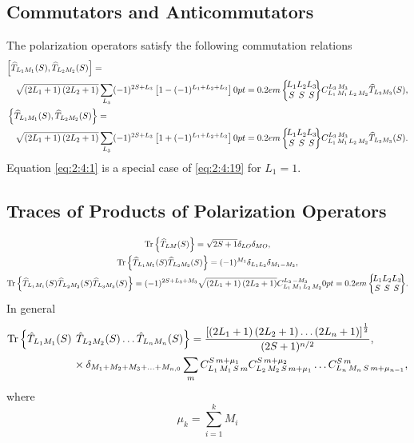 \subsection{Commutators and Anticommutators}
The polarization operators satisfy the following commutation relations
\begin{align}
& {\left[\widehat{T}_{L_{1} M_{1}}(S), \widehat{T}_{L_{2} M_{2}}(S)\right]=}  \notag\\
& \quad \sqrt{\left(2 L_{1}+1\right)\left(2 L_{2}+1\right)} \sum_{L_{3}}(-1)^{2 S+L_{3}}\left[1-(-1)^{L_{1}+L_{2}+L_{3}}\right]\sixj{L_{1}}{L_{2}}{L_{3}} {S}{S}{S}
 \clebsch{L_{1}}{M_{1}}{L_{2}}{M_{2}}{L_{3}}{M_{3}} \widehat{T}_{L_{3} M_{3}}(S) , \label{eq:2:4:19}\\
& \left\{\widehat{T}_{L_{1} M_{1}}(S), \widehat{T}_{L_{2} M_{2}}(S)\right\}=  \notag\\
& \quad \sqrt{\left(2 L_{1}+1\right)\left(2 L_{2}+1\right)} \sum_{L_{3}}(-1)^{2 S+L_{3}}\left[1+(-1)^{L_{1}+L_{2}+L_{3}}\right]
\sixj{L_{1}}{L_{2}}{L_{3}} {S}{S}{S}
 \clebsch{L_{1}}{M_{1}}{L_{2}}{M_{2}}{L_{3}}{M_{3}}
 \widehat{T}_{L_{3} M_{3}}(S) .\label{eq:2:4:20}
\end{align}
Equation \eqref{eq:2:4:1} is a special case of \eqref{eq:2:4:19} for $L_{1}=1$.

\subsection{Traces of Products of Polarization Operators}
\begin{gather}
\Tr \left\{\widehat{T}_{L M}(S)\right\}=\sqrt{2 S+1} \delta_{L O} \delta_{M O},  \label{eq:2:4:21}\\
\Tr \left\{\widehat{T}_{L_{1} M_{1}}(S) \widehat{T}_{L_{2} M_{2}}(S)\right\}=(-1)^{M_{1}} \delta_{L_{1} L_{2}} \delta_{M_{1}-M_{2}},  \label{eq:2:4:22}\\
\Tr \left\{\widehat{T}_{L_{1} M_{1}}(S) \widehat{T}_{L_{2} M_{2}}(S) \widehat{T}_{L_{3} M_{3}}(S)\right\}=(-1)^{2 S+L_{3}+M_{3}} \sqrt{\left(2 L_{1}+1\right)\left(2 L_{2}+1\right)} \clebsch{L_{1}}{M_{1}}{L_{2}}{M_{2}}{L_{3}}{-M_{3}}\sixj{L_{1}}{L_{2}}{L_{3}} {S}{S}{S}
 . \label{eq:2:4:23}
\end{gather}
In general
\begin{align}
\operatorname{Tr} \left\{\hat{T}_{L_{1} M_{1}}(S)\right. & \left.\hat{T}_{L_{2} M_{2}}(S) \ldots \hat{T}_{L_{n} M_{n}}(S)\right\}=\frac{\left[\left(2 L_{1}+1\right)\left(2 L_{2}+1\right) \ldots\left(2 L_{n}+1\right)\right]^{\frac{1}{2}}}{(2 S+1)^{n / 2}}  ,\notag\\
& \times \delta_{M_{1}+M_{2}+M_{3}+\ldots+M_{n, 0}} \sum_{m} C_{L_{1}\,M_{1}\,S\,m}^{S\,m+\mu_{1}} C_{L_{2}\,M_{2}\,S\,m+\mu_{1}}^{S\,m+\mu_{2}} \ldots C_{L_{n}\,M_{n}\,S\,m+\mu_{n-1}}^{S\,m} ,\label{eq:2:4:24}
\end{align}
where
\[
\mu_{k}=\sum_{i=1}^{k} M_{i}
\]
